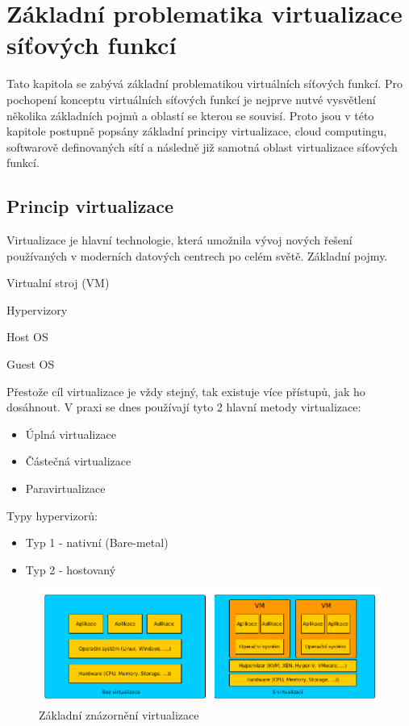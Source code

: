 \chapter{Základní problematika virtualizace síťových funkcí}

Tato kapitola se zabývá základní problematikou virtuálních síťových funkcí. Pro pochopení konceptu virtuálních síťových funkcí je nejprve nutvé vysvětlení několika základních pojmů a oblastí se kterou se souvisí. Proto jsou v této kapitole postupně popsány základní principy virtualizace, cloud computingu, softwarově definovaných sítí a následně již samotná oblast virtualizace síťových funkcí.


\section{Princip virtualizace}

Virtualizace je hlavní technologie, která umožnila vývoj nových řešení používaných v moderních datových centrech po celém světě. 
Základní pojmy. 

Virtualní stroj (VM)

Hypervizory

Host OS

Guest OS

Přestože cíl virtualizace je vždy stejný, tak existuje více přístupů, jak ho dosáhnout. V praxi se dnes používají tyto 2 hlavní metody virtualizace:

\begin{itemize}

\item Úplná virtualizace
\item Částečná virtualizace
\item Paravirtualizace

\end{itemize}

Typy hypervizorů:
\begin{itemize}
\item Typ 1 - nativní (Bare-metal)
\item Typ 2 - hostovaný
\end{itemize}


\begin{figure}[h]
\begin{centering}
\includegraphics[scale=0.5]{images/virtualization}
\par\end{centering}
\caption{Základní znázornění virtualizace\label{fig:virtualization}}
\end{figure}


